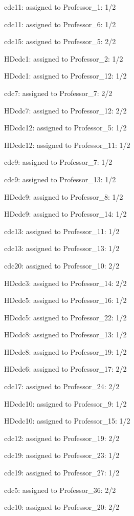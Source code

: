 \documentclass{article} %
\begin{document}
\noindent cdc11: assigned to Professor\_1: 1/2

\noindent cdc11: assigned to Professor\_6: 1/2

\noindent cdc15: assigned to Professor\_5: 2/2

\noindent HDcdc1: assigned to Professor\_2: 1/2

\noindent HDcdc1: assigned to Professor\_12: 1/2

\noindent cdc7: assigned to Professor\_7: 2/2

\noindent HDcdc7: assigned to Professor\_12: 2/2

\noindent HDcdc12: assigned to Professor\_5: 1/2

\noindent HDcdc12: assigned to Professor\_11: 1/2

\noindent cdc9: assigned to Professor\_7: 1/2

\noindent cdc9: assigned to Professor\_13: 1/2

\noindent HDcdc9: assigned to Professor\_8: 1/2

\noindent HDcdc9: assigned to Professor\_14: 1/2

\noindent cdc13: assigned to Professor\_11: 1/2

\noindent cdc13: assigned to Professor\_13: 1/2

\noindent cdc20: assigned to Professor\_10: 2/2

\noindent HDcdc3: assigned to Professor\_14: 2/2

\noindent HDcdc5: assigned to Professor\_16: 1/2

\noindent HDcdc5: assigned to Professor\_22: 1/2

\noindent HDcdc8: assigned to Professor\_13: 1/2

\noindent HDcdc8: assigned to Professor\_19: 1/2

\noindent HDcdc6: assigned to Professor\_17: 2/2

\noindent cdc17: assigned to Professor\_24: 2/2

\noindent HDcdc10: assigned to Professor\_9: 1/2

\noindent HDcdc10: assigned to Professor\_15: 1/2

\noindent cdc12: assigned to Professor\_19: 2/2

\noindent cdc19: assigned to Professor\_23: 1/2

\noindent cdc19: assigned to Professor\_27: 1/2

\noindent cdc5: assigned to Professor\_36: 2/2

\noindent cdc10: assigned to Professor\_20: 2/2
\end{document}
